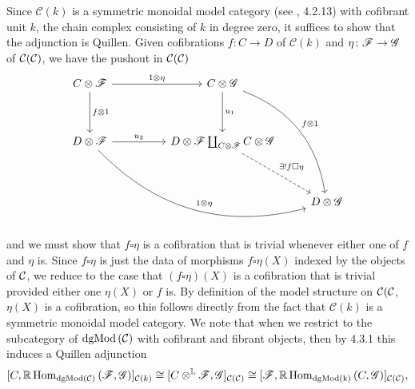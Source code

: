 \documentclass[dissertation.tex]{subfiles}
\begin{document}
\begin{rmk}
\begin{itemize}
    Since $\mathcal{C}(k)$ is a symmetric monoidal model category (see \cite{Hovey98}, 4.2.13) with cofibrant unit $k$, the chain complex consisting of $k$ in degree zero, it suffices to show that the adjunction is Quillen.
    Given cofibrations $f \colon C \to D$ of $\mathcal{C}(k)$ and $\eta \colon \mathscr{F} \to \mathscr{G}$ of $\mathcal{C}(\mathcal{C})$,
    we have the pushout in $\mathcal{C}(\mathcal{C})$
    $$\begin{tikzcd}
      C \otimes \F \arrow{rr}{1 \otimes \eta}\arrow{dd}{f \otimes 1} && C \otimes \G \arrow{dd}{u_1}\arrow[bend left]{rdddd}{f \otimes 1}\\
      \\
      D \otimes \F \arrow{rr}{u_2}\arrow[bend right]{rrrdd}{1 \otimes \eta} && D \otimes \F \coprod_{C \otimes \F} C \otimes \G\arrow[dashed]{rdd}{\exists !f \square \eta}\\
      \\
      & & & D \otimes \G
    \end{tikzcd}$$
    and we must show that $f \square \eta$ is a cofibration that is trivial whenever either one of $f$ and $\eta$ is.
    Since $f \square \eta$ is just the data of morphisms $f \square \eta(X)$
    indexed by the objects of $\mathcal{C}$, we reduce to the case that $(f \square \eta)(X)$ is a cofibration that is trivial provided either one $\eta(X)$ or $f$ is.
    By definition of the model structure on $\mathcal{C}(\mathcal{C}$, $\eta(X)$ is a cofibration, so this follows directly from the fact that $\mathcal{C}(k)$ is a symmetric monoidal model category.
    We note that when we restrict to the subcategory of $\operatorname{dgMod\left(\mathcal{C}\right)}$ with cofibrant and fibrant objects, then by \cite{Hovey98} 4.3.1 this induces a Quillen adjunction 
    $$[C,\mathbb{R}\operatorname{Hom}_{\operatorname{dgMod\left(\mathcal{C}\right)}}\left(\mathscr{F},\mathscr{G}\right)]_{\mathcal{C}(k)}
    \cong [C \otimes^\mathbb{L} \mathscr{F}, \mathscr{G}]_{\mathcal{C}(\mathcal{C})}
    \cong [\mathscr{F}, \mathbb{R}\operatorname{Hom}_{\operatorname{dgMod\left(k\right)}}\left(C,\mathscr{G}\right)]_{\mathcal{C}(\mathcal{C})},$$

\end{itemize}
\end{rmk}
\end{document}
